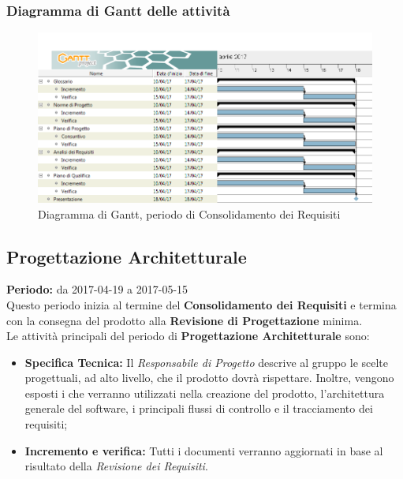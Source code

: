 	\subsubsection{Diagramma di Gantt delle attività}
	\begin{figure}[H]
		\centering
		\includegraphics[width=1\linewidth]{immagini/gantt/consolidamento_requisiti.png}
		\caption{Diagramma di Gantt, periodo di Consolidamento dei Requisiti}
	\end{figure}
	\subsection{Progettazione Architetturale}
	\textbf{Periodo:} da 2017-04-19 a 2017-05-15 \\
	Questo periodo inizia al termine del \textbf{Consolidamento dei Requisiti} e termina con la consegna del prodotto alla \textbf{Revisione di Progettazione} minima. \\
	Le attività principali del periodo di \textbf{Progettazione Architetturale} sono: \\
	\begin{itemize}
		\item \textbf{Specifica Tecnica:} Il \textit{Responsabile di Progetto} descrive al gruppo le scelte progettuali, ad alto livello, che il prodotto dovrà rispettare. Inoltre, vengono esposti i  che verranno utilizzati nella creazione del prodotto, l'architettura generale del software, i principali flussi di controllo e il tracciamento dei requisiti;
		\item \textbf{Incremento e verifica:} Tutti i documenti verranno aggiornati in base al risultato
della \textit{Revisione dei Requisiti}. \\
	\end{itemize}
